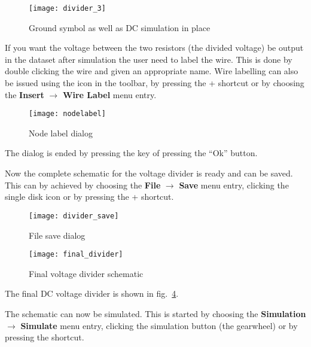 \begin{figure}[ht]
  \centering
  \texttt{[image: divider\_3]}
  \caption{Ground symbol as well as DC simulation in place}
  \label{fig:divider_3}
\end{figure}
\FloatBarrier


If you want the voltage between the two resistors (the divided
voltage) be output in the dataset after simulation the user need to
label the wire.  This is done by double clicking the wire and given an
appropriate name.  Wire labelling can also be issued using the icon in
the toolbar, by pressing the \Ctrl+ shortcut or by
choosing the \textbf{Insert} $\rightarrow$ \textbf{Wire Label} menu
entry.

\begin{figure}[ht]
  \centering
  \texttt{[image: nodelabel]}
  \caption{Node label dialog}
  \label{fig:nodelabel}
\end{figure}
\FloatBarrier

The dialog is ended by pressing the \Enter key of pressing the ``Ok''
button.

\medskip

Now the complete schematic for the voltage divider is ready and can be
saved.  This can by achieved by choosing the \textbf{File}
$\rightarrow$ \textbf{Save} menu entry, clicking the single disk icon
or by pressing the \Ctrl+ shortcut.

\begin{figure}[ht]
  \centering
  \texttt{[image: divider\_save]}
  \caption{File save dialog}
  \label{fig:divider_save}
\end{figure}
\FloatBarrier

\begin{figure}[ht]
  \centering
  \texttt{[image: final\_divider]}
  \caption{Final voltage divider schematic}
  \label{fig:final_divider}
\end{figure}
\FloatBarrier

The final DC voltage divider is shown in fig.~\ref{fig:final_divider}.


The schematic can now be simulated.  This is started by choosing the
\textbf{Simulation} $\rightarrow$ \textbf{Simulate} menu entry,
clicking the simulation button (the gearwheel) or by pressing the
 shortcut.

